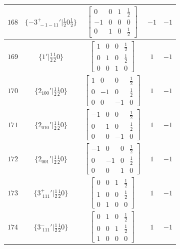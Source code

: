 \documentclass[fleqn,8pt]{jsarticle}
\begin{document}
\begin{longtable}{ccccc}
$ 168 $ & $ \{-3^{+}_{\,\,-1-11}{}'|\frac{1}{2} 0 \frac{1}{2}\} $ & $ \begin{bmatrix} 0 & 0 & 1 & \frac{1}{2} \\ -1 & 0 & 0 & 0 \\ 0 & 1 & 0 & \frac{1}{2} \end{bmatrix} $ & $ -1 $ & $ -1 $ \\ \hline
$ 169 $ & $ \{1{}'|\frac{1}{2} \frac{1}{2} 0\} $ & $ \begin{bmatrix} 1 & 0 & 0 & \frac{1}{2} \\ 0 & 1 & 0 & \frac{1}{2} \\ 0 & 0 & 1 & 0 \end{bmatrix} $ & $ 1 $ & $ -1 $ \\ \hline
$ 170 $ & $ \{2{}_{100}{}'|\frac{1}{2} \frac{1}{2} 0\} $ & $ \begin{bmatrix} 1 & 0 & 0 & \frac{1}{2} \\ 0 & -1 & 0 & \frac{1}{2} \\ 0 & 0 & -1 & 0 \end{bmatrix} $ & $ 1 $ & $ -1 $ \\ \hline
$ 171 $ & $ \{2{}_{010}{}'|\frac{1}{2} \frac{1}{2} 0\} $ & $ \begin{bmatrix} -1 & 0 & 0 & \frac{1}{2} \\ 0 & 1 & 0 & \frac{1}{2} \\ 0 & 0 & -1 & 0 \end{bmatrix} $ & $ 1 $ & $ -1 $ \\ \hline
$ 172 $ & $ \{2{}_{001}{}'|\frac{1}{2} \frac{1}{2} 0\} $ & $ \begin{bmatrix} -1 & 0 & 0 & \frac{1}{2} \\ 0 & -1 & 0 & \frac{1}{2} \\ 0 & 0 & 1 & 0 \end{bmatrix} $ & $ 1 $ & $ -1 $ \\ \hline
$ 173 $ & $ \{3^{+}_{\,\,111}{}'|\frac{1}{2} \frac{1}{2} 0\} $ & $ \begin{bmatrix} 0 & 0 & 1 & \frac{1}{2} \\ 1 & 0 & 0 & \frac{1}{2} \\ 0 & 1 & 0 & 0 \end{bmatrix} $ & $ 1 $ & $ -1 $ \\ \hline
$ 174 $ & $ \{3^{-}_{\,\,111}{}'|\frac{1}{2} \frac{1}{2} 0\} $ & $ \begin{bmatrix} 0 & 1 & 0 & \frac{1}{2} \\ 0 & 0 & 1 & \frac{1}{2} \\ 1 & 0 & 0 & 0 \end{bmatrix} $ & $ 1 $ & $ -1 $ \\ \hline

\end{longtable}
\end{document}
